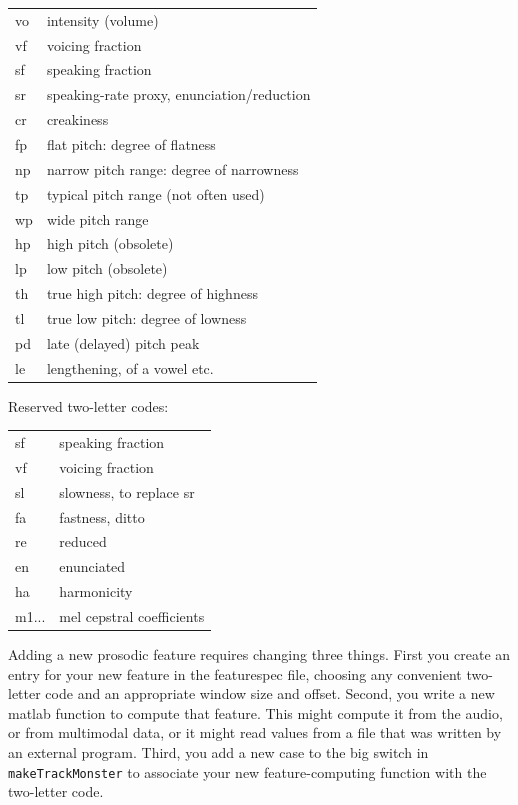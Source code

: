 \documentclass[11pt]{article}
\begin{document}
\begin{tabular}{ll}
  vo  & intensity (volume) \\
  vf  & voicing fraction \\
  sf  & speaking fraction \\
  sr  & speaking-rate proxy, enunciation/reduction \\
  cr  & creakiness \\
  fp  & flat pitch: degree of flatness \\
  np  & narrow pitch range: degree of narrowness \\
  tp  & typical pitch range (not often used)\\
  wp  & wide pitch range  \\
  hp  & high pitch (obsolete) \\ 
  lp  & low pitch (obsolete) \\
  th  & true high pitch: degree of highness  \\ 
  tl  & true low pitch: degree of lowness \\
  pd  & late (delayed) pitch peak \\
  le  & lengthening, of a vowel etc. \\
\end{tabular}

Reserved two-letter codes: 

\begin{tabular}{ll}  
  sf      & speaking fraction \\
  vf      & voicing fraction \\
  sl      & slowness, to replace sr \\
  fa      & fastness, ditto\\
  re      & reduced \\
  en      & enunciated \\
  ha      & harmonicity \\
  m1...   & mel cepstral coefficients
\end{tabular}

Adding a new prosodic feature requires changing three things.  First
you create an entry for your new feature in the featurespec file,
choosing any convenient two-letter code and an appropriate window size
and offset.  Second, you write a new matlab function to compute that
feature.  This might compute it from the audio, or from multimodal
data, or it might read values from a file that was written by an
external program.  Third, you add a new case to the big switch in {\tt
  makeTrackMonster} to associate your new feature-computing function
with the two-letter code.
\end{document}
